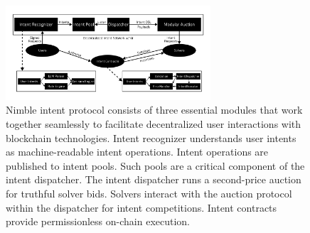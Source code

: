 \documentclass[11pt,letterpaper,twocolumn]{article}
\begin{document}
\begin{figure}[t]
\centering
\includegraphics[width=3in]{fig/intent-architecture-hr.png}
\caption{Nimble intent protocol consists of three essential modules that work together seamlessly to facilitate decentralized user interactions with blockchain technologies.
Intent recognizer understands user intents as machine-readable intent operations. Intent operations are published to intent pools. Such pools are a critical component of the intent dispatcher. The intent dispatcher runs a second-price auction for truthful solver bids. Solvers interact with the auction protocol within the dispatcher for intent competitions. Intent contracts provide permissionless on-chain execution.} 
\label{fig:intent-architecture}
\vspace{0pt}
\end{figure}
\end{document}

